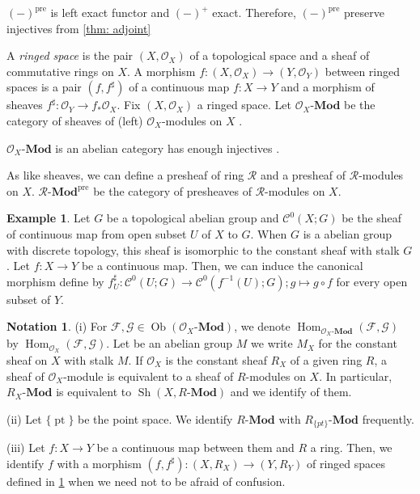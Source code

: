 \documentclass[a4paper,dvipdfmx,reqno,12pt]{amsart}
\makeatletter
\newcommand{\ind}[2]{\emph{#1}\index{1{#2}@{#1}}}
\newcommand{\indse}[2]{{$#1$}\index{0{#2}@{$#1$}}}
\theoremstyle{definition}
\newtheorem{Eg}[Thm]{Example}
\newtheorem{Not}[Thm]{Notation}
\newcommand{\mcal}[1]{\mathcal{#1}}%
\newcommand{\opn}[1]{\operatorname{#1}}
\newcommand{\catn}[1]{\mathbf{#1}}
\numberwithin{equation}{section}
\makeatother
\begin{document}
$(-)^{\opn{pre}}$ is left exact functor and $(-)^{+}$ exact. Therefore, $(-)^{\opn{pre}}$ preserve injectives from \cref{thm: adjoint}

A \ind{ringed space}{ringed space} is the pair $(X,\mcal{O}_X)$ of a topological space and a sheaf of commutative rings on $X$.
A morphism $f:(X,\mcal{O}_X)\to (Y,\mcal{O}_Y)$ between ringed spaces is a pair $(f,f^{\sharp})$ of a continuous map $f:X\to Y$ and a morphism of sheaves $f^{\sharp}: \mcal{O}_Y \to f_*\mcal{O}_X$.
Fix $(X,\mcal{O}_X)$ a ringed space.
Let $\mcal{O}_X\text{-}\catn{Mod}$ be the category of sheaves of (left) $\mcal{O}_X$-modules on $X$ \cite[Definition 2.2.6]{MR1299726}.

$\mcal{O}_X\text{-}\catn{Mod}$ is an abelian category has enough injectives \cite[Proposition 2.4.3]{MR1299726}.

As like sheaves, we can define a presheaf of ring $\mcal{R}$ and a presheaf of $\mcal{R}$-modules on $X$. $\mcal{R}\text{-}\catn{Mod}^{\opn{pre}}$ be the category of presheaves of $\mcal{R}$-modules on $X$.



\begin{Eg} \label{eg: topologicalmorphism}
  Let $G$ be a topological abelian group and \indse{\mcal{C}^{0}(X;G)}{C^{0}(X;G)} be the sheaf of continuous map from open subset $U$ of $X$ to $G$. When $G$ is a abelian group with discrete topology, this sheaf is isomorphic to the constant sheaf with stalk $G$.
  Let $f:X\to Y$ be a continuous map. Then, we can induce the canonical morphism define by $f_U^{\sharp}:\mcal{C}^{0}(U;G)\to \mcal{C}^{0}(f^{-1}(U);G); g\mapsto g\circ f$ for every open subset of $Y$.
\end{Eg}

\begin{Not}
  (i) For $\mcal{F},\mcal{G}\in \opn{Ob}(\mcal{O}_X\text{-}\catn{Mod})$,
  we denote $\opn{Hom}_{\mcal{O}_X\text{-}\catn{Mod}}(\mcal{F},\mcal{G})$ by $\opn{Hom}_{\mcal{O}_X}(\mcal{F},\mcal{G})$.
  Let be an abelian group $M$ we write $M_X$ for the constant sheaf on $X$ with stalk $M$. If $\mcal{O}_X$ is the constant sheaf $R_X$ of a given ring $R$, a sheaf of $\mcal{O}_X$-module is equivalent to a sheaf of $R$-modules on $X$.
  In particular, $R_X\text{-}\catn{Mod}$ is equivalent to $\opn{Sh}(X,R\text{-}\catn{Mod})$ and we identify of them.

  (ii) Let $\{\opn{pt}\}$ be the point space. We identify $R\text{-}\catn{Mod}$ with $R_{\{pt\}}\text{-}\catn{Mod}$ frequently.

  (iii)  Let $f:X\to Y$ be a continuous map between them and $R$ a ring. Then, we identify $f$ with a morphism $(f,f^{\sharp}):(X,R_X)\to (Y,R_Y)$ of ringed spaces defined in \cref{eg: topologicalmorphism} when we need not to be afraid of confusion.
\end{Not}
\end{document}
